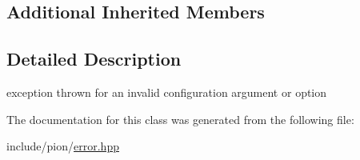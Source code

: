 \subsection*{Additional Inherited Members}


\subsection{Detailed Description}
exception thrown for an invalid configuration argument or option 

The documentation for this class was generated from the following file\-:\begin{DoxyCompactItemize}
\item 
include/pion/\hyperlink{error_8hpp}{error.\-hpp}\end{DoxyCompactItemize}
